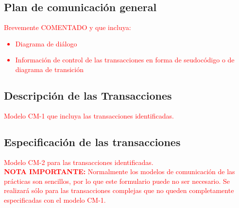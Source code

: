 \documentclass[12pt,a4paper,twoside,spanish]{article}      %
\begin{document}
\subsection{Plan de comunicación general}

\textcolor {red}
{
Brevemente COMENTADO y que incluya:
\begin{itemize}
 \item Diagrama de diálogo
 \item Información de control de las transacciones en forma de
seudocódigo o de diagrama de transición
\end{itemize}
}

\subsection{Descripción de las Transacciones}
\textcolor {red} {Modelo CM-1 que incluya las transacciones identificadas.}


\subsection{Especificación de las transacciones}

\textcolor {red} {
Modelo CM-2 para las transacciones identificadas.
\\
\textbf{NOTA IMPORTANTE:} Normalmente los modelos de comunicación de las prácticas son sencillos, por lo que este formulario puede no ser necesario. Se realizará sólo
para las transacciones complejas que no queden completamente
especificadas con el modelo CM-1.
}

\end{document}
